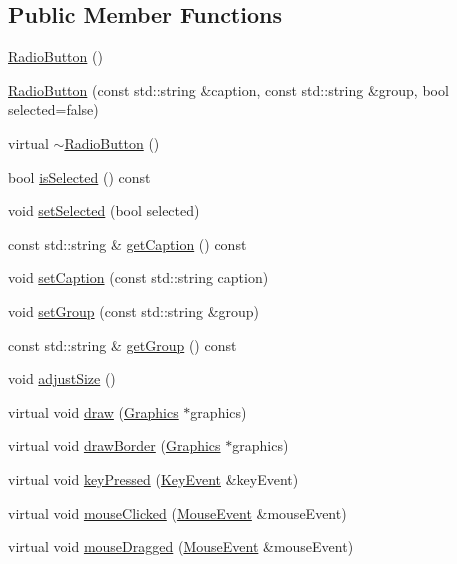 \subsection*{Public Member Functions}
\begin{DoxyCompactItemize}
\item 
\hyperlink{classgcn_1_1RadioButton_a7817db192e30ebd83590100fdaa2a45b}{Radio\+Button} ()
\item 
\hyperlink{classgcn_1_1RadioButton_a02da792088c2d88902ce7dab6e4eb190}{Radio\+Button} (const std\+::string \&caption, const std\+::string \&group, bool selected=false)
\item 
virtual \hyperlink{classgcn_1_1RadioButton_a20cfe6d9de8d1ba67a72bb1a258779e4}{$\sim$\+Radio\+Button} ()
\item 
bool \hyperlink{classgcn_1_1RadioButton_a82183e482e3607573f9b9810e32e6584}{is\+Selected} () const 
\item 
void \hyperlink{classgcn_1_1RadioButton_a0f0b0ec40bea84ebe012fe888c88f161}{set\+Selected} (bool selected)
\item 
const std\+::string \& \hyperlink{classgcn_1_1RadioButton_ad8e47b0184c91a1292f7a8a26b05d5ee}{get\+Caption} () const 
\item 
void \hyperlink{classgcn_1_1RadioButton_a188ffbaf12992ead1a94574c68e13839}{set\+Caption} (const std\+::string caption)
\item 
void \hyperlink{classgcn_1_1RadioButton_a398a36c548338d482bbadafbbfa4c3ba}{set\+Group} (const std\+::string \&group)
\item 
const std\+::string \& \hyperlink{classgcn_1_1RadioButton_a526f6b5a7bac68862bab34eda2aa3fcb}{get\+Group} () const 
\item 
void \hyperlink{classgcn_1_1RadioButton_a420abe6c90b38f343ec12cad6b322a75}{adjust\+Size} ()
\item 
virtual void \hyperlink{classgcn_1_1RadioButton_a19a37cd744564c8aa6799c7402aa696c}{draw} (\hyperlink{classgcn_1_1Graphics}{Graphics} $\ast$graphics)
\item 
virtual void \hyperlink{classgcn_1_1RadioButton_a885f22ffa519c099f58862bcea78678e}{draw\+Border} (\hyperlink{classgcn_1_1Graphics}{Graphics} $\ast$graphics)
\item 
virtual void \hyperlink{classgcn_1_1RadioButton_a7ce3f4f687af91cab8337fb6ac7002c4}{key\+Pressed} (\hyperlink{classgcn_1_1KeyEvent}{Key\+Event} \&key\+Event)
\item 
virtual void \hyperlink{classgcn_1_1RadioButton_a49973b6bfddf94c8c77e267eafeb9222}{mouse\+Clicked} (\hyperlink{classgcn_1_1MouseEvent}{Mouse\+Event} \&mouse\+Event)
\item 
virtual void \hyperlink{classgcn_1_1RadioButton_a3053fc9462fdc57e894ab4c06a1e6bd9}{mouse\+Dragged} (\hyperlink{classgcn_1_1MouseEvent}{Mouse\+Event} \&mouse\+Event)
\end{DoxyCompactItemize}
